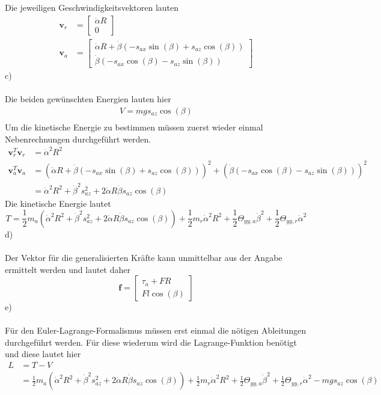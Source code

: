 Die jeweiligen Geschwindigkeitsvektoren lauten
\begin{align*}
	\textbf{v}_r &= \begin{bmatrix}
		\dot{\alpha}R \\
		0
	\end{bmatrix} \\
	\textbf{v}_a &= \begin{bmatrix}
		\dot{\alpha}R + \dot{\beta}(-s_{ax}\sin(\beta) + s_{az}\cos(\beta)) \\
		\dot{\beta}(- s_{ax}\cos(\beta) - s_{az}\sin(\beta))
	\end{bmatrix}
\end{align*}
c)\\ \\
Die beiden gewünschten Energien lauten hier
\begin{align*}
	V = mgs_{az}\cos(\beta) \\
\end{align*}
Um die kinetische Energie zu bestimmen müssen zuerst wieder einmal Nebenrechnungen durchgeführt werden.
\begin{align*}
	\textbf{v}_r^T\textbf{v}_r &= \dot{\alpha}^2R^2 \\
	\textbf{v}_a^T\textbf{v}_a &= (\dot{\alpha}R + \dot{\beta}(-s_{ax}\sin(\beta) + s_{az}\cos(\beta)))^2 + (\dot{\beta}(-s_{ax}\cos(\beta) - s_{az}\sin(\beta)))^2 \\
	&= \dot{\alpha}^2R^2 + \dot{\beta}^2s^2_{az} + 2\dot{\alpha}R\dot{\beta}s_{az}\cos(\beta)
\end{align*}
Die kinetische Energie lautet
\[
	T = \frac{1}{2}m_a\left(\dot{\alpha}^2R^2 + \dot{\beta}^2s^2_{az} + 2\dot{\alpha}R\dot{\beta}s_{az}\cos(\beta)\right) + \frac{1}{2}m_r\dot{\alpha}^2R^2 + \frac{1}{2}\Theta_{yy,a}\dot{\beta}^2 + \frac{1}{2}\Theta_{yy,r}\dot{\alpha}^2
\]
d)\\ \\
Der Vektor für die generalisierten Kräfte kann unmittelbar aus der Angabe ermittelt werden und lautet daher
\[
	\textbf{f} = \begin{bmatrix}
		\tau_a + FR \\
		Fl\cos(\beta)
	\end{bmatrix}
\]
e)\\ \\
Für den Euler-Lagrange-Formalismus müssen erst einmal die nötigen Ableitungen durchgeführt werden. Für diese wiederum wird die Lagrange-Funktion benötigt und diese lautet hier
\begin{align*}
	L &= T - V \\
	  &= \frac{1}{2}m_a\left(\dot{\alpha}^2R^2 + \dot{\beta}^2s^2_{az} + 2\dot{\alpha}R\dot{\beta}s_{az}\cos(\beta)\right) + \frac{1}{2}m_r\dot{\alpha}^2R^2 + \frac{1}{2}\Theta_{yy,a}\dot{\beta}^2 + \frac{1}{2}\Theta_{yy,r}\dot{\alpha}^2 - mgs_{az}\cos(\beta)
\end{align*}
